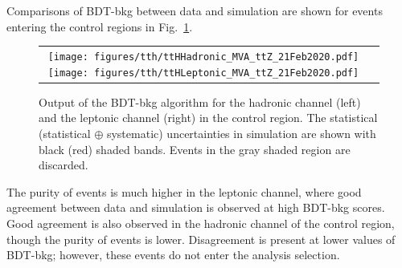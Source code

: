 Comparisons of BDT-bkg between data and simulation are shown for events entering the \ttZ control regions in Fig.~\ref{fig:tth_bdt-bkg_ttz}.

\begin{figure} [htbp!]
    \centering
    \begin{tabular}{c c}
        \texttt{[image: figures/tth/ttHHadronic\_MVA\_ttZ\_21Feb2020.pdf]}
        \texttt{[image: figures/tth/ttHLeptonic\_MVA\_ttZ\_21Feb2020.pdf]}
    \end{tabular}
    \caption{Output of the BDT-bkg algorithm for the hadronic channel (left) and the leptonic channel (right) in the \ttZ control region. The statistical (statistical $\oplus$ systematic) uncertainties in simulation are shown with black (red) shaded bands. Events in the gray shaded region are discarded.} 
    \label{fig:tth_bdt-bkg_ttz}
\end{figure}

The purity of \ttZ events is much higher in the leptonic channel, where good agreement between data and simulation is observed at high BDT-bkg scores.
Good agreement is also observed in the hadronic channel of the \ttZ control region, though the purity of \ttZ events is lower.
Disagreement is present at lower values of BDT-bkg; however, these events do not enter the analysis selection.
